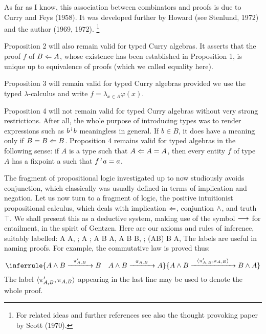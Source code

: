 As far as I know, this association between combinators and proofs is due to Curry and Feys (1958).
It was developed further by Howard (see Stenlund, 1972) and the author (1969, 1972).%
\footnote{For related ideas and further references see also the thought provoking paper by Scott (1970).}%

Proposition 2 will also remain valid for typed Curry algebras.
It asserts that the proof $f$ of $B \Leftarrow A$, whose existence has
been established in Proposition 1, is unique up to equivalence of
proofs (which we called equality here).

Proposition 3 will remain valid for typed Curry algebras
provided we use the typed $\lambda$-calculus and write
$f = \lambda_{x \in A} \varphi(x)$.

Proposition 4 will not remain valid for typed Curry algebras without
very strong restrictions. After all, the whole purpose of introducing types was
to render expressions such as $b \mathop{{}^\wr}\kern-.8pt b$ meaningless in general. If $b \in B$, it does have
a meaning only if $B = B \Leftarrow B$. Proposition 4 remains valid for typed algebras in the
following sense: if $A$ is a type such that $A \Leftarrow A = A$, then every entity $f$ of type $A$
has a fixpoint a such that $f\mathop{{}^\wr}\kern-.8pt a= a$.

The fragment of propositional logic investigated up to now studiously avoids
conjunction, which classically was usually defined in terms of implication and negation.
Let us now turn to a fragment of logic, the positive intuitionist propositional calculus,
which deals with implication $\Leftarrow$, conjuntion $\wedge$, and truth $\top$.
We shall present this as a deductive system, making use of the symbol $\longrightarrow$ for entailment,
in the spirit of Gentzen. Here are our axioms and rules of inference, suitably labelled:
\bes
A  A, \qquad {};
\ees
\bes
A  \top;
\ees
\bes
A \sland B \xto{\prAB} A,\,\,A \sland B \xto{\prpAB} B, \quad
{};
\ees
\bes
(A\from B) \sland B  A, \qquad {}
\ees
The labels are useful in naming proofs. For example, the commutative law is proved thus:
$$
\inferrule{A \sland B \xto{\prpAB} B\quad A \sland B \xto{\prAB} A}{A \sland B \xto{\bracket{\prpAB,\prAB}} B\sland A}
$$
The label $\langle \pi'_{A,B},\pi_{A,B} \rangle$ appearing in the last line may be used
to denote the whole proof.

